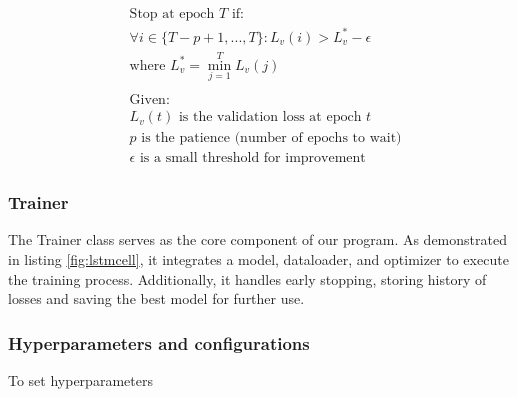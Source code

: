 \begin{align*}
&\text{Stop at epoch } T \text{ if:} \\
&\forall i \in \{T-p+1, ..., T\}: L_v(i) > L_v^* - \epsilon \\
&\text{where } L_v^* = \min_{j=1}^{T} L_v(j) \\
\\
&\text{Given:} \\
&L_v(t) \text{ is the validation loss at epoch } t \\
&p \text{ is the patience (number of epochs to wait)} \\
&\epsilon \text{ is a small threshold for improvement}
\end{align*}

\subsubsection{Trainer}

The Trainer class serves as the core component of our program. As demonstrated in listing \ref{fig:lstmcell}, it integrates a model, dataloader, and optimizer to execute the training process. Additionally, it handles early stopping, storing history of losses and saving the best model for further use.

\subsubsection{Hyperparameters and configurations}

To set hyperparameters 
